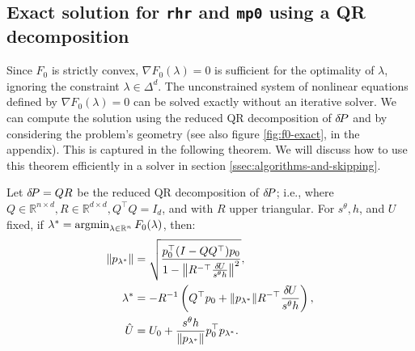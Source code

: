 \documentclass[smallcondensed]{svjour3}
\begin{document}

\subsection{Exact solution for \texttt{rhr} and \texttt{mp0} using a
  QR decomposition}\label{ssec:exact-soln}

Since $F_0$ is strictly convex, $\nabla F_0(\lambda) = 0$ is
sufficient for the optimality of $\lambda$, ignoring the constraint
$\lambda \in \Delta^d$. The unconstrained system of nonlinear
equations defined by $\nabla F_0(\lambda) = 0$ can be solved exactly
without an iterative solver. We can compute the solution using the
reduced QR decomposition of ${\delta \hspace{-0.14em} P}$ and by considering the problem's
geometry (see also figure \ref{fig:f0-exact}, in the appendix). This
is captured in the following theorem. We will discuss how to use this
theorem efficiently in a solver in section\@
\ref{ssec:algorithms-and-skipping}.

\begin{theorem}\label{thm:f0-exact}
  Let ${\delta \hspace{-0.14em} P} = QR$ be the reduced QR decomposition of ${\delta \hspace{-0.14em} P}$; i.e.,
  where
  $Q \in \mathbb{R}^{n \times d}, R \in \mathbb{R}^{d \times d},
  Q^\top Q = I_d$, and with $R$ upper triangular. For $s^\theta, h$,
  and $U$ fixed, if
  $\lambda^* = \operatorname{argmin}_{\lambda \in \mathbb{R}^n}
  F_0(\lambda)$, then:
  \begin{align}
    \|p_{\lambda^*}\| &= \sqrt{\frac{p_0^\top {(I - QQ^\top)} p_0}{1 - \left\|R^{-\top} \frac{{\delta \hspace{-0.09em} U}}{s^\theta h}\right\|^2}},\label{eq:l-star-expression} \\
    \lambda^* &= -R^{-1} \left(Q^\top p_0 + \|p_{\lambda^*}\| R^{-\top} \frac{{\delta \hspace{-0.09em} U}}{s^\theta h}\right),\label{eq:f0-exact-lambda} \\
    \hat{U} &= U_0 + \frac{s^\theta h}{\|p_{\lambda^*}\|} p_0^\top p_{\lambda^*}.\label{eq:f0-exact}
  \end{align}
\end{theorem}
\end{document}
